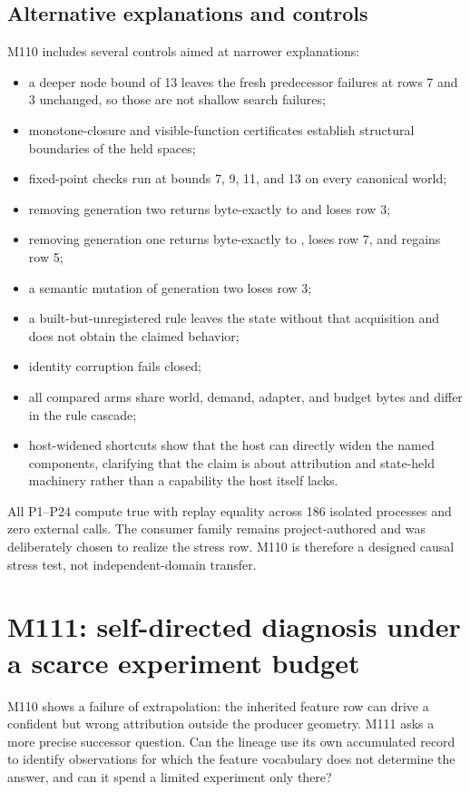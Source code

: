 \subsection{Alternative explanations and controls}
M110 includes several controls aimed at narrower explanations:
\begin{itemize}
  \item a deeper node bound of 13 leaves the fresh predecessor failures at rows 7 and 3 unchanged, so those are not shallow search failures;
  \item monotone-closure and visible-function certificates establish structural boundaries of the held spaces;
  \item fixed-point checks run at bounds 7, 9, 11, and 13 on every canonical world;
  \item removing generation two returns byte-exactly to \mone and loses row 3;
  \item removing generation one returns byte-exactly to \mzero, loses row 7, and regains row 5;
  \item a semantic mutation of generation two loses row 3;
  \item a built-but-unregistered rule leaves the state without that acquisition and does not obtain the claimed behavior;
  \item identity corruption fails closed;
  \item all compared arms share world, demand, adapter, and budget bytes and differ in the rule cascade;
  \item host-widened shortcuts show that the host can directly widen the named components, clarifying that the claim is about attribution and state-held machinery rather than a capability the host itself lacks.
\end{itemize}
All P1--P24 compute true with replay equality across 186 isolated processes and zero external calls. The consumer family remains project-authored and was deliberately chosen to realize the stress row. M110 is therefore a designed causal stress test, not independent-domain transfer.

\section{M111: self-directed diagnosis under a scarce experiment budget}
\label{sec:m111}
M110 shows a failure of extrapolation: the inherited feature row can drive a confident but wrong attribution outside the producer geometry. M111 asks a more precise successor question. Can the lineage use its own accumulated record to identify observations for which the feature vocabulary does not determine the answer, and can it spend a limited experiment only there?

